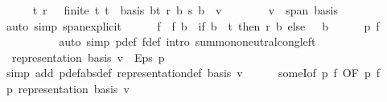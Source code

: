 \begin{isabellebody}
\ \ \ \ \isamarkupfalse%
\ t\ r\ \ {\isacharasterisk}{\kern0pt}{\isacharcolon}{\kern0pt}\ {\isachardoublequoteopen}finite\ t{\isachardoublequoteclose}\ {\isachardoublequoteopen}t\ {\isasymsubseteq}\ basis{\isachardoublequoteclose}\ {\isachardoublequoteopen}{\isacharparenleft}{\kern0pt}{\isasymSum}b{\isasymin}t{\isachardot}{\kern0pt}\ r\ b\ {\isacharasterisk}{\kern0pt}s\ b{\isacharparenright}{\kern0pt}\ {\isacharequal}{\kern0pt}\ v{\isachardoublequoteclose}\isanewline
\ \ \ \ \ \ \isamarkupfalse%
\ {\isacartoucheopen}v\ {\isasymin}\ span\ basis{\isacartoucheclose}\ \isamarkupfalse%
\ {\isacharparenleft}{\kern0pt}auto\ simp{\isacharcolon}{\kern0pt}\ span{\isacharunderscore}{\kern0pt}explicit{\isacharparenright}{\kern0pt}\isanewline
\ \ \ \ \isamarkupfalse%
\ f\ \ {\isachardoublequoteopen}f\ b\ {\isacharequal}{\kern0pt}\ {\isacharparenleft}{\kern0pt}if\ b\ {\isasymin}\ t\ then\ r\ b\ else\ {}{\isacharparenright}{\kern0pt}{\isachardoublequoteclose}\ \ b\isanewline
\ \ \ \ \isamarkupfalse%
\ {\isachardoublequoteopen}p\ f{\isachardoublequoteclose}\isanewline
\ \ \ \ \ \ \isamarkupfalse%
\ {\isacharasterisk}{\kern0pt}\ \isamarkupfalse%
\ {\isacharparenleft}{\kern0pt}auto\ simp{\isacharcolon}{\kern0pt}\ p{\isacharunderscore}{\kern0pt}def\ f{\isacharunderscore}{\kern0pt}def\ intro{\isacharbang}{\kern0pt}{\isacharcolon}{\kern0pt}\ sum{\isachardot}{\kern0pt}mono{\isacharunderscore}{\kern0pt}neutral{\isacharunderscore}{\kern0pt}cong{\isacharunderscore}{\kern0pt}left{\isacharparenright}{\kern0pt}\isanewline
\ \ \ \ \isamarkupfalse%
\ {\isacharasterisk}{\kern0pt}{\isacharcolon}{\kern0pt}\ {\isachardoublequoteopen}representation\ basis\ v\ {\isacharequal}{\kern0pt}\ Eps\ p{\isachardoublequoteclose}\ \isamarkupfalse%
\ {\isacharparenleft}{\kern0pt}simp\ add{\isacharcolon}{\kern0pt}\ p{\isacharunderscore}{\kern0pt}def{\isacharbrackleft}{\kern0pt}abs{\isacharunderscore}{\kern0pt}def{\isacharbrackright}{\kern0pt}\ representation{\isacharunderscore}{\kern0pt}def\ basis\ v{\isacharparenright}{\kern0pt}\isanewline
\ \ \ \ \isamarkupfalse%
\ someI{\isacharbrackleft}{\kern0pt}of\ p\ f{\isacharcomma}{\kern0pt}\ OF\ {\isacartoucheopen}p\ f{\isacartoucheclose}{\isacharbrackright}{\kern0pt}\ \isamarkupfalse%
\ {\isachardoublequoteopen}p\ {\isacharparenleft}{\kern0pt}representation\ basis\ v{\isacharparenright}{\kern0pt}{\isachardoublequoteclose}\isanewline

\end{isabellebody}
